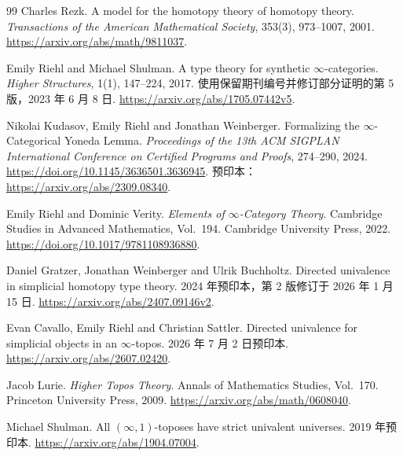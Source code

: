 \documentclass[12pt,oneside,openany,fontset=none]{ctexbook}
\theoremstyle{cn}
\numberwithin{equation}{chapter}
\begin{document}
\begin{thebibliography}{99}
Charles Rezk.
A model for the homotopy theory of homotopy theory.
\emph{Transactions of the American Mathematical Society}, 353(3), 973--1007, 2001.
\url{https://arxiv.org/abs/math/9811037}.

Emily Riehl and Michael Shulman.
A type theory for synthetic $\infty$-categories.
\emph{Higher Structures}, 1(1), 147--224, 2017.
使用保留期刊编号并修订部分证明的第 5 版，2023 年 6 月 8 日.
\url{https://arxiv.org/abs/1705.07442v5}.

Nikolai Kudasov, Emily Riehl and Jonathan Weinberger.
Formalizing the $\infty$-Categorical Yoneda Lemma.
\emph{Proceedings of the 13th ACM SIGPLAN International Conference on Certified Programs and Proofs}, 274--290, 2024.
\url{https://doi.org/10.1145/3636501.3636945}.
预印本：\url{https://arxiv.org/abs/2309.08340}.

Emily Riehl and Dominic Verity.
\emph{Elements of $\infty$-Category Theory}.
Cambridge Studies in Advanced Mathematics, Vol.~194. Cambridge University Press, 2022.
\url{https://doi.org/10.1017/9781108936880}.

Daniel Gratzer, Jonathan Weinberger and Ulrik Buchholtz.
Directed univalence in simplicial homotopy type theory.
2024 年预印本，第 2 版修订于 2026 年 1 月 15 日.
\url{https://arxiv.org/abs/2407.09146v2}.

Evan Cavallo, Emily Riehl and Christian Sattler.
Directed univalence for simplicial objects in an $\infty$-topos.
2026 年 7 月 2 日预印本.
\url{https://arxiv.org/abs/2607.02420}.

Jacob Lurie.
\emph{Higher Topos Theory}.
Annals of Mathematics Studies, Vol.~170. Princeton University Press, 2009.
\url{https://arxiv.org/abs/math/0608040}.

Michael Shulman.
All $(\infty,1)$-toposes have strict univalent universes.
2019 年预印本.
\url{https://arxiv.org/abs/1904.07004}.

\end{thebibliography}
\end{document}
